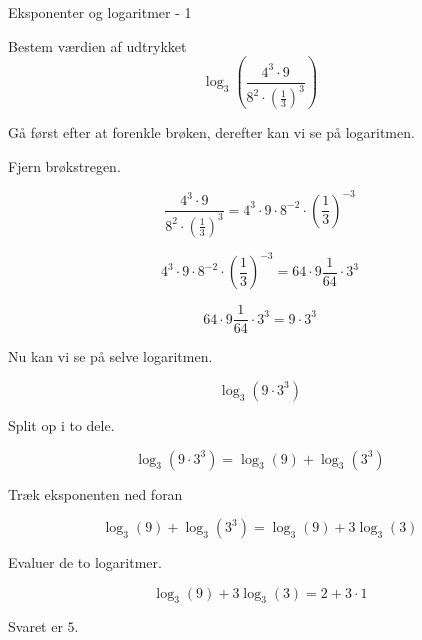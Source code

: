 \documentclass{article}
\begin{document}
\tableofcontents
\newpage

\begin{exercise}{Eksponenter og logaritmer - 1}

Bestem værdien af udtrykket
\[
\log_3\left( \frac{4^3 \cdot 9}{8^2 \cdot \left(\frac{1}{3}\right)^3} \right)
\]


\hint
Gå først efter at forenkle brøken, derefter kan vi se på logaritmen.

\hint
Fjern brøkstregen.

\hint
\[
\frac{4^3 \cdot 9}{8^2 \cdot \left(\frac{1}{3}\right)^3}
 = 4^3 \cdot 9 \cdot 8^{-2} \cdot \left(\frac{1}{3}\right)^{-3}
\]

\hint
\[
4^3 \cdot 9 \cdot 8^{-2} \cdot \left(\frac{1}{3}\right)^{-3}
 = 64 \cdot 9 \frac{1}{64} \cdot 3^3
\]

\hint
\[
64 \cdot 9 \frac{1}{64} \cdot 3^3
 = 9 \cdot 3^3
\]

\hint
Nu kan vi se på selve logaritmen.

\hint
\[
\log_3\left(9 \cdot 3^3\right)
\]

\hint
Split op i to dele.

\hint
\[
\log_3\left(9 \cdot 3^3\right) = \log_3(9) + \log_3\left(3^3\right)
\]

\hint
Træk eksponenten ned foran

\hint
\[
\log_3(9) + \log_3\left(3^3\right) = \log_3(9) + 3\log_3(3)
\]

\hint
Evaluer de to logaritmer.

\hint
\[
\log_3(9) + 3\log_3(3) = 2 + 3 \cdot 1
\]

\hint
Svaret er $5$.

\end{exercise}

\newpage
\end{document}

